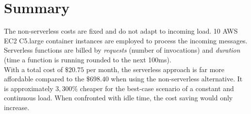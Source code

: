 \section{Summary}

The non-serverless costs are fixed and do not adapt to incoming load. 10 AWS EC2 C5.large container instances are employed to process the incoming messages.\\
Serverless functions are billed by \textit{requests} (number of invocations) and \textit{duration} (time a  function is running rounded to the next 100ms).\\
With a total cost of $\$20.75$ per month, the serverless approach is far more affordable compared to the $\$698.40$ when using the non-serverless alternative. It is approximately $3,300\%$ cheaper for the best-case scenario of a constant and continuous load. When confronted with idle time, the cost saving would only increase.